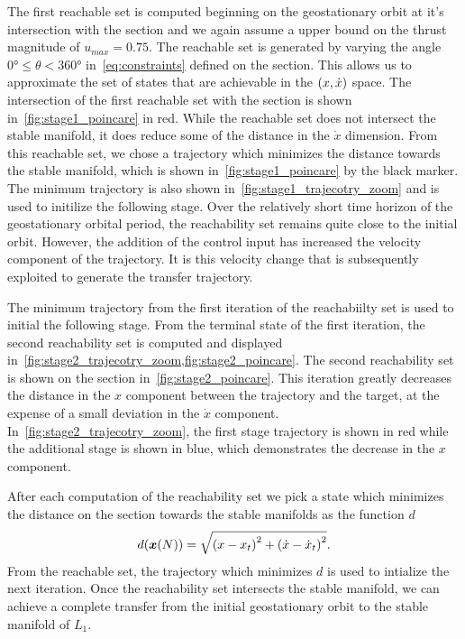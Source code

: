 \documentclass[smallcondensed]{svjour3}
\begin{document}
The first reachable set is computed beginning on the geostationary orbit at it's intersection with the \Poincare section and we again assume a upper bound on the thrust magnitude of \( u_{max} = 0.75 \).
The reachable set is generated by varying the angle \( \ang{0} \leq \theta < \ang{360} \) in~\cref{eq:constraints} defined on the \Poincare section.
This allows us to approximate the set of states that are achievable in the \( \left( x ,\dot{x} \right) \) space.
The intersection of the first reachable set with the \Poincare section is shown in~\cref{fig:stage1_poincare} in red.
While the reachable set does not intersect the stable manifold, it does reduce some of the distance in the \(\dot{x}\) dimension.
From this reachable set, we chose a trajectory which minimizes the distance towards the stable manifold, which is shown in~\cref{fig:stage1_poincare} by the black marker.
The minimum trajectory is also shown in~\cref{fig:stage1_trajecotry_zoom} and is used to initilize the following stage.
Over the relatively short time horizon of the geostationary orbital period, the reachability set remains quite close to the initial orbit. 
However, the addition of the control input has increased the velocity component of the trajectory.
It is this velocity change that is subsequently exploited to generate the transfer trajectory.

The minimum trajectory from the first iteration of the reachabiilty set is used to initial the following stage.
From the terminal state of the first iteration, the second reachability set is computed and displayed in~\cref{fig:stage2_trajecotry_zoom,fig:stage2_poincare}.
The second reachability set is shown on the \Poincare section in~\cref{fig:stage2_poincare}.
This iteration greatly decreases the distance in the \( x \) component between the trajectory and the target, at the expense of a small deviation in the \( \dot{x} \) component.
In~\cref{fig:stage2_trajecotry_zoom}, the first stage trajectory is shown in red while the additional stage is shown in blue, which demonstrates the decrease in the \( x \) component.

After each computation of the reachability set we pick a state which minimizes the distance on the \Poincare section towards the stable manifolds as the function \( d \)
\begin{align*}
        d(\bm{x}(N)) = \sqrt{\left( x - x_t \right)^2 + \left( \dot{x} - \dot{x}_t \right)^2}.
\end{align*}
From the reachable set, the trajectory which minimizes \( d \) is used to intialize the next iteration.
Once the reachability set intersects the stable manifold, we can achieve a complete transfer from the initial geostationary orbit to the stable manifold of \( L_1 \).
\end{document}
